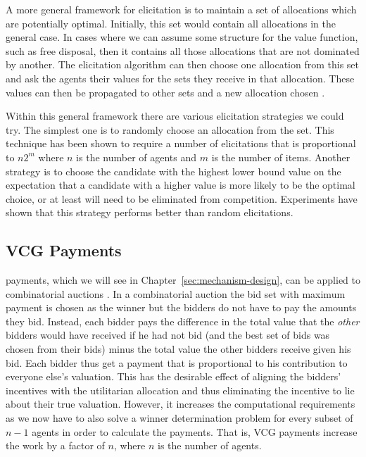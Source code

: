 \medskip

A more general framework for elicitation is to maintain a set of
allocations which are potentially optimal. Initially, this set would
contain all allocations in the general case. In cases where we can
assume some structure for the value function, such as free disposal,
then it contains all those allocations that are not dominated by
another. The elicitation algorithm can then choose one allocation from
this set and ask the agents their values for the sets they receive in
that allocation. These values can then be propagated to other sets and
a new allocation chosen \cite{conen01a,conen01b}.

Within this general framework there are various elicitation strategies
we could try. The simplest one is to randomly choose an allocation
from the set. This technique has been shown to require a number of
elicitations that is proportional to $n2^m$ where $n$ is the number of
agents and $m$ is the number of items. Another strategy is to choose
the candidate with the highest lower bound value on the expectation
that a candidate with a higher value is more likely to be the optimal
choice, or at least will need to be eliminated from
competition. Experiments have shown that this strategy performs better
than random elicitations.

\subsection{VCG Payments}
\label{sec:vcg-payments}

 payments, which we will see in
Chapter~\ref{sec:mechanism-design}, can be applied to combinatorial
auctions \cite{mackie-mason94a}. In a  combinatorial auction
the bid set with maximum payment is chosen as the winner but the
bidders do not have to pay the amounts they bid.  Instead, each bidder
pays the difference in the total value that the \emph{other} bidders
would have received if he had not bid (and the best set of bids was
chosen from their bids) minus the total value the other bidders
receive given his bid. Each bidder thus get a payment that is
proportional to his contribution to everyone else's valuation.  This
has the desirable effect of aligning the bidders' incentives with the
utilitarian allocation and thus eliminating the incentive to lie about
their true valuation. However, it increases the computational
requirements as we now have to also solve a winner determination
problem for every subset of $n -1$ agents in order to calculate the
payments. That is, VCG payments increase the work by a factor of $n$,
where $n$ is the number of agents.

